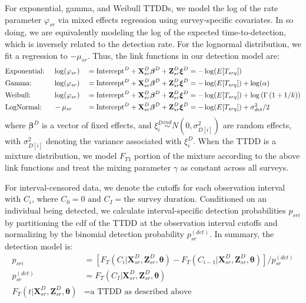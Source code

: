 \documentclass[useAMS,usenatbib,referee,12pt]{article}
\begin{document}
For exponential, gamma, and Weibull TTDDs, we model the log of the rate parameter $\varphi_{sr}$ via mixed effects regression using survey-specific covariates.  In so doing, we are equivalently modeling the log of the expected time-to-detection, which is inversely related to the detection rate.  For the lognormal distribution, we fit a regression to $-\mu_{sr}$.  Thus, the link functions in our detection model are:
\begin{alignat}{3}
&\text{Exponential:\;} &&\log(\varphi_{sr}) &&= \text{Intercept}^D + \textbf{X}_{sr}^D\boldsymbol{\beta}^D + \textbf{Z}_{sr}^D\boldsymbol{\xi}^D = -\log(E[T_{srq}])\\
&\text{Gamma:} &&\log(\varphi_{sr}) &&= \text{Intercept}^D + \textbf{X}_{sr}^D\boldsymbol{\beta}^D + \textbf{Z}_{sr}^D\boldsymbol{\xi}^D = -\log(E[T_{srq}]) + \log(\alpha)\\
&\text{Weibull:}  &&\log(\varphi_{sr}) &&= \text{Intercept}^D + \textbf{X}_{sr}^D\boldsymbol{\beta}^D + \textbf{Z}_{sr}^D\boldsymbol{\xi}^D = -\log(E[T_{srq}]) + \log\left(\Gamma\left(1 + 1/k\right)\right)\\
&\text{LogNormal:} &&-\mu_{sr} &&= \text{Intercept}^D + \textbf{X}_{sr}^D\boldsymbol{\beta}^D + \textbf{Z}_{sr}^D\boldsymbol{\xi}^D = -\log(E[T_{srq}]) + \sigma_{det}^2/2
\end{alignat}
where $\boldsymbol{\beta}^D$ is a vector of fixed effects, and $\xi_i^D \overset{ind}{\sim} N(0,\sigma_{D[i]}^2)$ are random effects, with $\sigma_{D[i]}^2$ denoting the variance associated with $\xi_i^D$.  When the TTDD is a mixture distribution, we model $F_{T1}$ portion of the mixture according to the above link functions and treat the mixing parameter $\gamma$ as constant across all surveys.

For interval-censored data, we denote the cutoffs for each observation interval with $C_i$, where $C_0 = 0 \text{ and } C_I = \text{the survey duration}$.  Conditioned on an individual being detected, we calculate interval-specific detection probabilities $p_{sri}$ by partitioning the cdf of the TTDD at the observation interval cutoffs and normalizing by the binomial detection probability $p_{sr}^{(det)}$.  In summary, the detection model is:
\begin{align}
p_{sri} &= \left[F_T(C_i|\textbf{X}_{sr}^D, \textbf{Z}_{sr}^D, \boldsymbol{\theta}) - F_T(C_{i-1}|\textbf{X}_{sr}^D, \textbf{Z}_{sr}^D, \boldsymbol{\theta})\right]\big/p_{sr}^{(det)}\\
\label{eq:pdet}p_{sr}^{(det)} &= F_T(C_I|\textbf{X}_{sr}^D, \textbf{Z}_{sr}^D, \boldsymbol{\theta})\\
F_T(t|\textbf{X}_{sr}^D, \textbf{Z}_{sr}^D, \boldsymbol{\theta}) &= \text{a TTDD as described above}
\end{align}
\end{document}
